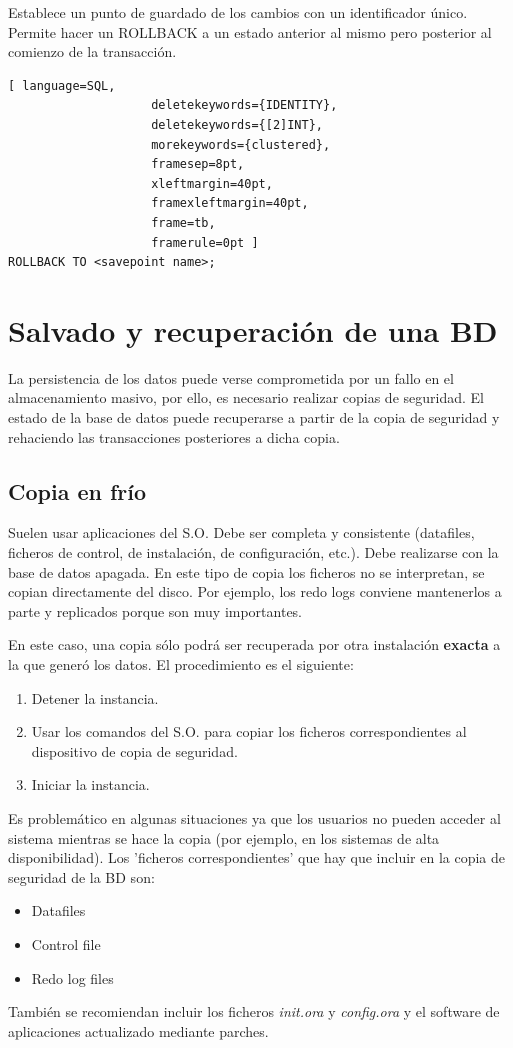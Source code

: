 Establece un punto de guardado de los cambios con un identificador único. Permite hacer un ROLLBACK a un estado anterior al mismo pero posterior al comienzo de la transacción.

\begin{lstlisting}[ language=SQL,
                    deletekeywords={IDENTITY},
                    deletekeywords={[2]INT},
                    morekeywords={clustered},
                    framesep=8pt,
                    xleftmargin=40pt,
                    framexleftmargin=40pt,
                    frame=tb,
                    framerule=0pt ]
ROLLBACK TO <savepoint name>;
\end{lstlisting}

\section{Salvado y recuperación de una BD}

La persistencia de los datos puede verse comprometida por un fallo en el almacenamiento masivo, por ello, es necesario realizar copias de seguridad. El estado de la base de datos puede recuperarse a partir de la copia de seguridad y rehaciendo las transacciones posteriores a dicha copia.

\subsection{Copia en frío}

Suelen usar aplicaciones del S.O. Debe ser completa y consistente (datafiles, ficheros de control, de instalación, de configuración, etc.). Debe realizarse con la base de datos apagada. En este tipo de copia los ficheros no se interpretan, se copian directamente del disco. Por ejemplo, los redo logs conviene mantenerlos a parte y replicados porque son muy importantes.

En este caso, una copia sólo podrá ser recuperada por otra instalación \textbf{exacta} a la que generó los datos. El procedimiento es el siguiente:
\begin{enumerate}
\item Detener la instancia.
\item Usar los comandos del S.O. para copiar los ficheros correspondientes al dispositivo de copia de seguridad.
\item Iniciar la instancia.
\end{enumerate}

Es problemático en algunas situaciones ya que los usuarios no pueden acceder al sistema mientras se hace la copia (por ejemplo, en los sistemas de alta disponibilidad). Los 'ficheros correspondientes' que hay que incluir en la copia de seguridad de la BD son:
\begin{itemize}
\item Datafiles
\item Control file
\item Redo log files
\end{itemize}
También se recomiendan incluir los ficheros \textit{init.ora} y \textit{config.ora} y el software de aplicaciones actualizado mediante parches.

